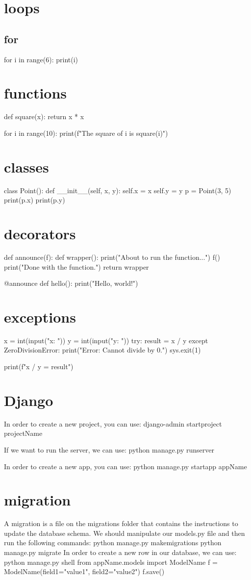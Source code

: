 \documentclass[12pt]{article}
\begin{document}
\begin{itemize}
\section{loops}
\subsection{for}
for i in range(6):
    print(i)

\section{functions}
def square(x):
    return x * x

for i in range(10):
    print(f"The square of {i} is {square(i)}")

\section{classes}
class Point():
    def __init__(self, x, y):
        self.x = x
        self.y = y
p = Point(3, 5)
print(p.x)
print(p.y)

\section{decorators}
def announce(f):
    def wrapper():
        print("About to run the function...")
        f()
        print("Done with the function.")
    return wrapper

@announce
def hello():
    print("Hello, world!")

\section{exceptions}
x = int(input("x: "))
y = int(input("y: "))
try:
    result = x / y
except ZeroDivisionError:
    print("Error: Cannot divide by 0.")
    sys.exit(1)

print(f"{x} / {y} = {result}")


\section{Django}
In order to create a new project, you can use:
django-admin startproject projectName

If we want to run the server, we can use:
python manage.py runserver

In order to create a new app, you can use:
python manage.py startapp appName

\section{migration}
A migration is a file on the migrations folder that contains the instructions to update the database schema.
We should manipulate our models.py file and then run the following commands:
python manage.py makemigrations
python manage.py migrate
In order to create a new row in our database, we can use:
python manage.py shell
from appName.models import ModelName
f = ModelName(field1="value1", field2="value2")
f.save()


\end{itemize}
\end{document}
